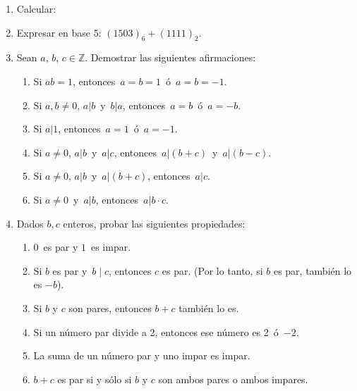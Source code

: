 \documentclass[a4paper,12pt,twoside,spanish,reqno]{amsbook}
\numberwithin{equation}{section}
\begin{document}
\begin{enumerate}
\item Calcular:

\item Expresar en  base $5$:  $(1503)_6 + (1111)_2$.  

\item Sean $a$, $b$, $c \in {\mathbb Z}$. Demostrar las siguientes afirmaciones:
    \begin{enumerate}
        \item Si $ab=1$, entonces \,$a=b=1$\, ó \,$a=b=-1$.
        \item Si $a,b \neq 0$,  $a| b$\, y \,$b | a$, entonces \,$a=b$\, ó \,$a=-b$.
        \item Si $a | 1$, entonces \,$a=1$\, ó \,$a=-1$.
        \item Si $a \neq 0$, $a | b$\, y \,$a | c$, entonces \,$a | (b+c)$\, y \,$a | (b-c)$.
        \item Si $a \neq 0$, $a | b$\, y \,$a | (b+c)$, entonces \,$a | c$.
        \item Si $a \neq 0$\, y \,$a | b$, entonces \,$a| b\cdot c$.
    \end{enumerate}


\item Dados $b,c$ enteros, probar las siguientes propiedades:
    \begin{enumerate}
        \item  $0$\, es par y $1$\, es impar.
        \item  Si $b$ es par y \,$b \mid c$, entonces $c$ es par.  (Por lo tanto, si $b$ es par, también lo es $-b$).
        \item  Si $b$ y $c$ son pares, entonces $b+c$ también lo es. %
        \item  Si un número par divide a 2, entonces ese número es 2\, ó \,$-2$.
        \item  La suma de un número par y uno impar es impar.
        \item $b + c$ es par si y  sólo si $b$ y $c$ son ambos pares o ambos impares.
    \end{enumerate}



\end{enumerate}
\end{document}
